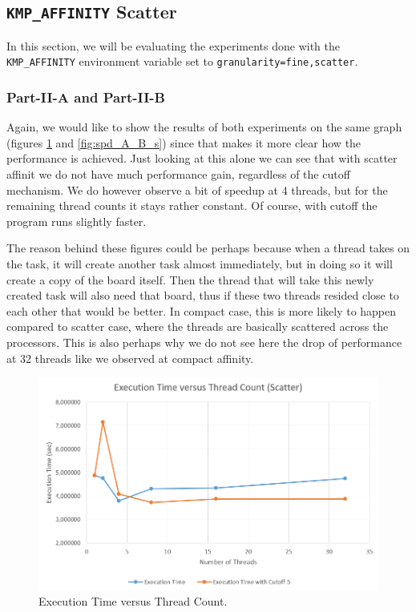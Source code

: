 \documentclass[11pt,reqno]{amsart}
\newcommand{\code}[1]{\texttt{#1}}
\begin{document}
\subsection{\code{KMP\_AFFINITY} Scatter}
In this section, we will be evaluating the experiments done with the \code{KMP\_AFFINITY} environment variable set to \code{granularity=fine,scatter}. 

\subsubsection{Part-II-A and Part-II-B}
Again, we would like to show the results of both experiments on the same graph (figures \ref{fig:exec_A_B_s} and \ref{fig:spd_A_B_s}) since that makes it more clear how the performance is achieved. Just looking at this alone we can see that with scatter affinit we do not have much performance gain, regardless of the cutoff mechanism. We do however observe a bit of speedup at 4 threads, but for the remaining thread counts it stays rather constant. Of course, with cutoff the program runs slightly faster.

The reason behind these figures could be perhaps because when a thread takes on the task, it will create another task almost immediately, but in doing so it will create a copy of the board itself. Then the thread that will take this newly created task will also need that board, thus if these two threads resided close to each other that would be better. In compact case, this is more likely to happen compared to scatter case, where the threads are basically scattered across the processors. This is also perhaps why we do not see here the drop of performance at 32 threads like we observed at compact affinity.

\begin{figure}[h]
\centering
\includegraphics[width=0.75\linewidth]{exectime_A_B_scatter.png}
\caption{Execution Time versus Thread Count.}
\label{fig:exec_A_B_s}
\end{figure}
\end{document}
